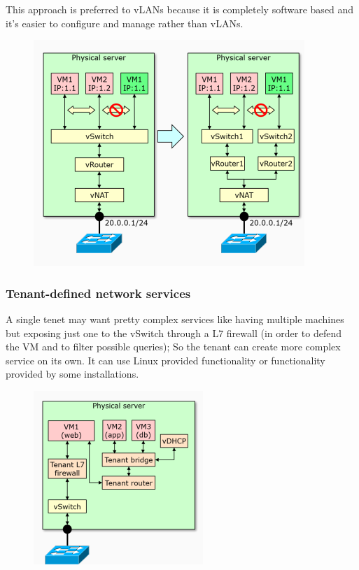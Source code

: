         This approach is preferred to vLANs because it is completely software based and it's easier to configure and manage rather than vLANs.
        \begin{figure}[h!]
            \centering
            \includegraphics[scale=0.55]{images/multi tenancy.png}
        \end{figure}
        \FloatBarrier
        
        
        
    \subsubsection{Tenant-defined network services}
        \FloatBarrier
        A single tenet may want pretty complex services like having multiple machines but exposing just one to the vSwitch through a L7 firewall (in order to defend the VM and to filter possible queries); So the tenant can create more complex service on its own. It can use Linux provided functionality or functionality provided by some installations.
        \begin{figure}[h!]
            \centering
            \includegraphics[scale=0.4]{images/tenant services.png}
        \end{figure}
        \FloatBarrier
        
